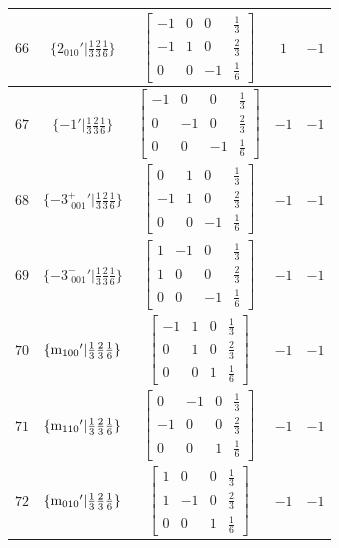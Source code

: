 \documentclass[fleqn,8pt]{jsarticle}
\begin{document}
\begin{longtable}{ccccc}
$ 66 $ & $ \{2{}_{010}{}'|\frac{1}{3} \frac{2}{3} \frac{1}{6}\} $ & $ \begin{bmatrix} -1 & 0 & 0 & \frac{1}{3} \\ -1 & 1 & 0 & \frac{2}{3} \\ 0 & 0 & -1 & \frac{1}{6} \end{bmatrix} $ & $ 1 $ & $ -1 $ \\ \hline
$ 67 $ & $ \{-1{}'|\frac{1}{3} \frac{2}{3} \frac{1}{6}\} $ & $ \begin{bmatrix} -1 & 0 & 0 & \frac{1}{3} \\ 0 & -1 & 0 & \frac{2}{3} \\ 0 & 0 & -1 & \frac{1}{6} \end{bmatrix} $ & $ -1 $ & $ -1 $ \\ \hline
$ 68 $ & $ \{-3^{+}_{\,\,001}{}'|\frac{1}{3} \frac{2}{3} \frac{1}{6}\} $ & $ \begin{bmatrix} 0 & 1 & 0 & \frac{1}{3} \\ -1 & 1 & 0 & \frac{2}{3} \\ 0 & 0 & -1 & \frac{1}{6} \end{bmatrix} $ & $ -1 $ & $ -1 $ \\ \hline
$ 69 $ & $ \{-3^{-}_{\,\,001}{}'|\frac{1}{3} \frac{2}{3} \frac{1}{6}\} $ & $ \begin{bmatrix} 1 & -1 & 0 & \frac{1}{3} \\ 1 & 0 & 0 & \frac{2}{3} \\ 0 & 0 & -1 & \frac{1}{6} \end{bmatrix} $ & $ -1 $ & $ -1 $ \\ \hline
$ 70 $ & $ \{{\rm m}_{100}{}'|\frac{1}{3} \frac{2}{3} \frac{1}{6}\} $ & $ \begin{bmatrix} -1 & 1 & 0 & \frac{1}{3} \\ 0 & 1 & 0 & \frac{2}{3} \\ 0 & 0 & 1 & \frac{1}{6} \end{bmatrix} $ & $ -1 $ & $ -1 $ \\ \hline
$ 71 $ & $ \{{\rm m}_{110}{}'|\frac{1}{3} \frac{2}{3} \frac{1}{6}\} $ & $ \begin{bmatrix} 0 & -1 & 0 & \frac{1}{3} \\ -1 & 0 & 0 & \frac{2}{3} \\ 0 & 0 & 1 & \frac{1}{6} \end{bmatrix} $ & $ -1 $ & $ -1 $ \\ \hline
$ 72 $ & $ \{{\rm m}_{010}{}'|\frac{1}{3} \frac{2}{3} \frac{1}{6}\} $ & $ \begin{bmatrix} 1 & 0 & 0 & \frac{1}{3} \\ 1 & -1 & 0 & \frac{2}{3} \\ 0 & 0 & 1 & \frac{1}{6} \end{bmatrix} $ & $ -1 $ & $ -1 $ \\
\end{longtable}
\end{document}
